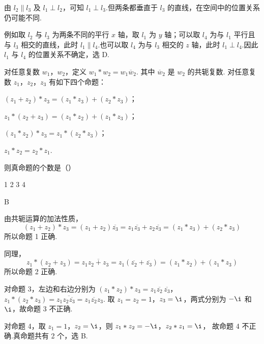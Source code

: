 \begin{solution}
由 \(l_2\parallel l_3\) 及 \(l_1\perp l_2\)，可知 \(l_1\perp l_3\).但两条都垂直于 \(l_3\) 的直线，在空间中的位置关系仍可能不同.

例如取 \(l_2\) 与 \(l_3\) 为两条不同的平行 \(x\) 轴，取 \(l_1\) 为 \(y\) 轴；可以取 \(l_4\) 为与 \(l_1\) 平行且与 \(l_3\) 相交的直线，此时 \(l_1\parallel l_4\).也可以取 \(l_4\) 为与 \(l_3\) 相交的 \(z\) 轴，此时 \(l_1\perp l_4\).因此 \(l_1\) 与 \(l_4\) 的位置关系不确定，选 D.
\end{solution}

\begin{problem}
对任意复数 \(w_{1}\)，\(w_{2}\)，定义 \(w_{1} * w_{2} = w_{1} \overline{w}_{2}\). 其中 \(\overline{w}_{2}\) 是 \(w_{2}\) 的共轭复数. 对任意复数 \(z_{1}\)，\(z_{2}\)，\(z_{3}\) 有如下四个命题：

\begin{circlelist}
\item \((z_{1} + z_{2}) * z_{3} = (z_{1} * z_{3}) + (z_{2} * z_{3})\)；
\item \(z_{1} * (z_{2} + z_{3}) = (z_{1} * z_{2}) + (z_{1} * z_{3})\)；
\item \((z_{1} * z_{2}) * z_{3} = z_{1} * (z_{2} * z_{3})\)；
\item \(z_{1} * z_{2} = z_{2} * z_{1}\).
\end{circlelist}

则真命题的个数是（\quad）

\choices
    {1}
    {2}
    {3}
    {4}
\end{problem}

\begin{answer}
B
\end{answer}

\begin{solution}
由共轭运算的加法性质，
\[
(z_1+z_2)*z_3=(z_1+z_2)\overline{z_3}
 =z_1\overline{z_3}+z_2\overline{z_3}
 =(z_1*z_3)+(z_2*z_3)
\]
所以命题 1 正确.

同理，
\[
z_1*(z_2+z_3)=z_1\overline{z_2+z_3}
 =z_1(\overline{z_2}+\overline{z_3})
 =(z_1*z_2)+(z_1*z_3)
\]
所以命题 2 正确.

对命题 3，左边和右边分别为
\((z_1*z_2)*z_3=z_1\overline{z_2}\,\overline{z_3}\)，\(z_1*(z_2*z_3)=z_1\overline{z_2\overline{z_3}}=z_1\overline{z_2}z_3\).
取 \(z_1=z_2=1\)，\(z_3=\i\)，两式分别为 \(-\i\) 和 \(\i\)，故命题 3 不正确.

对命题 4，取 \(z_1=1\)，\(z_2=\i\)，则
\(z_1*z_2=-\i\)，\(z_2*z_1=\i\)，
故命题 4 不正确.真命题共有 2 个，选 B.
\end{solution}

